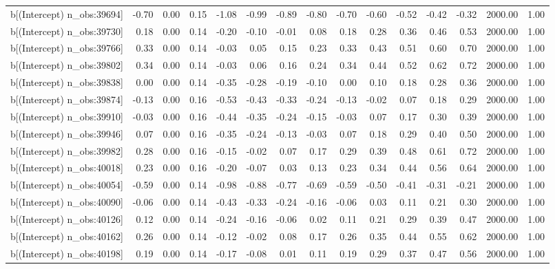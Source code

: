 \begin{table}[ht]
\begin{tabular}{rrrrrrrrrrrrrrr}
  b[(Intercept) n\_obs:39694] & -0.70 & 0.00 & 0.15 & -1.08 & -0.99 & -0.89 & -0.80 & -0.70 & -0.60 & -0.52 & -0.42 & -0.32 & 2000.00 & 1.00 \\ 
  b[(Intercept) n\_obs:39730] & 0.18 & 0.00 & 0.14 & -0.20 & -0.10 & -0.01 & 0.08 & 0.18 & 0.28 & 0.36 & 0.46 & 0.53 & 2000.00 & 1.00 \\ 
  b[(Intercept) n\_obs:39766] & 0.33 & 0.00 & 0.14 & -0.03 & 0.05 & 0.15 & 0.23 & 0.33 & 0.43 & 0.51 & 0.60 & 0.70 & 2000.00 & 1.00 \\ 
  b[(Intercept) n\_obs:39802] & 0.34 & 0.00 & 0.14 & -0.03 & 0.06 & 0.16 & 0.24 & 0.34 & 0.44 & 0.52 & 0.62 & 0.72 & 2000.00 & 1.00 \\ 
  b[(Intercept) n\_obs:39838] & 0.00 & 0.00 & 0.14 & -0.35 & -0.28 & -0.19 & -0.10 & 0.00 & 0.10 & 0.18 & 0.28 & 0.36 & 2000.00 & 1.00 \\ 
  b[(Intercept) n\_obs:39874] & -0.13 & 0.00 & 0.16 & -0.53 & -0.43 & -0.33 & -0.24 & -0.13 & -0.02 & 0.07 & 0.18 & 0.29 & 2000.00 & 1.00 \\ 
  b[(Intercept) n\_obs:39910] & -0.03 & 0.00 & 0.16 & -0.44 & -0.35 & -0.24 & -0.15 & -0.03 & 0.07 & 0.17 & 0.30 & 0.39 & 2000.00 & 1.00 \\ 
  b[(Intercept) n\_obs:39946] & 0.07 & 0.00 & 0.16 & -0.35 & -0.24 & -0.13 & -0.03 & 0.07 & 0.18 & 0.29 & 0.40 & 0.50 & 2000.00 & 1.00 \\ 
  b[(Intercept) n\_obs:39982] & 0.28 & 0.00 & 0.16 & -0.15 & -0.02 & 0.07 & 0.17 & 0.29 & 0.39 & 0.48 & 0.61 & 0.72 & 2000.00 & 1.00 \\ 
  b[(Intercept) n\_obs:40018] & 0.23 & 0.00 & 0.16 & -0.20 & -0.07 & 0.03 & 0.13 & 0.23 & 0.34 & 0.44 & 0.56 & 0.64 & 2000.00 & 1.00 \\ 
  b[(Intercept) n\_obs:40054] & -0.59 & 0.00 & 0.14 & -0.98 & -0.88 & -0.77 & -0.69 & -0.59 & -0.50 & -0.41 & -0.31 & -0.21 & 2000.00 & 1.00 \\ 
  b[(Intercept) n\_obs:40090] & -0.06 & 0.00 & 0.14 & -0.43 & -0.33 & -0.24 & -0.16 & -0.06 & 0.03 & 0.11 & 0.21 & 0.30 & 2000.00 & 1.00 \\ 
  b[(Intercept) n\_obs:40126] & 0.12 & 0.00 & 0.14 & -0.24 & -0.16 & -0.06 & 0.02 & 0.11 & 0.21 & 0.29 & 0.39 & 0.47 & 2000.00 & 1.00 \\ 
  b[(Intercept) n\_obs:40162] & 0.26 & 0.00 & 0.14 & -0.12 & -0.02 & 0.08 & 0.17 & 0.26 & 0.35 & 0.44 & 0.55 & 0.62 & 2000.00 & 1.00 \\ 
  b[(Intercept) n\_obs:40198] & 0.19 & 0.00 & 0.14 & -0.17 & -0.08 & 0.01 & 0.11 & 0.19 & 0.29 & 0.37 & 0.47 & 0.56 & 2000.00 & 1.00 \\ 

\end{tabular}
\end{table}
